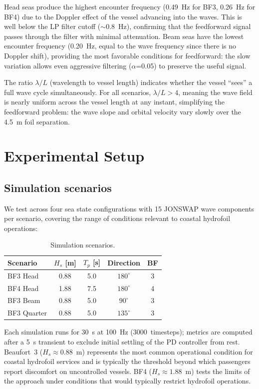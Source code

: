 \documentclass[review]{elsarticle}
\begin{document}
Head seas produce the highest encounter frequency (0.49~Hz for BF3,
0.26~Hz for BF4) due to the Doppler effect of the vessel advancing
into the waves.
This is well below the LP filter cutoff ($\sim$0.8~Hz), confirming
that the feedforward signal passes through the filter with minimal
attenuation.
Beam seas have the lowest encounter frequency (0.20~Hz, equal to the
wave frequency since there is no Doppler shift), providing the most
favorable conditions for feedforward: the slow variation allows even
aggressive filtering ($\alpha$=0.05) to preserve the useful signal.

The ratio $\lambda/L$ (wavelength to vessel length) indicates whether
the vessel ``sees'' a full wave cycle simultaneously.
For all scenarios, $\lambda/L > 4$, meaning the wave field is nearly
uniform across the vessel length at any instant, simplifying the
feedforward problem: the wave slope and orbital velocity vary slowly
over the 4.5~m foil separation.

\section{Experimental Setup}
\label{sec:experiments}

\subsection{Simulation scenarios}

We test across four sea state configurations with 15 JONSWAP
wave components per scenario, covering the range of conditions
relevant to coastal hydrofoil operations:

\begin{table}[h]
\centering
\caption{Simulation scenarios.}
\label{tab:scenarios}
\begin{tabular}{lcccc}
\toprule
Scenario & $H_s$ [m] & $T_p$ [s] & Direction & BF \\
\midrule
BF3 Head    & 0.88 & 5.0 & $180^\circ$ & 3 \\
BF4 Head    & 1.88 & 7.5 & $180^\circ$ & 4 \\
BF3 Beam    & 0.88 & 5.0 & $90^\circ$  & 3 \\
BF3 Quarter & 0.88 & 5.0 & $135^\circ$ & 3 \\
\bottomrule
\end{tabular}
\end{table}

Each simulation runs for 30~s at 100~Hz (3000~timesteps);
metrics are computed after a 5~s transient to exclude initial
settling of the PD controller from rest.
Beaufort~3 ($H_s \approx 0.88$~m) represents the most common
operational condition for coastal hydrofoil services and is
typically the threshold beyond which passengers report discomfort
on uncontrolled vessels.
BF4 ($H_s \approx 1.88$~m) tests the limits of the approach under
conditions that would typically restrict hydrofoil operations.
\end{document}
